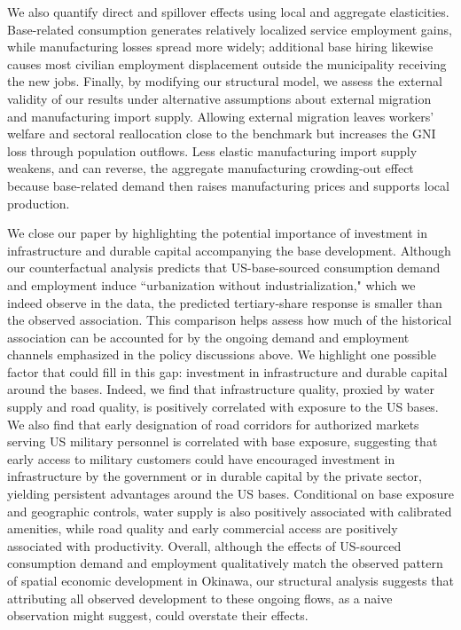 \documentclass[12pt, unicode, a4paper]{article}
\newcommand{\1}{\mbox{1}\hspace{-0.25em}\mbox{l}} %
\begin{document}
We also quantify direct and spillover effects using local and aggregate elasticities. Base-related consumption generates relatively localized service employment gains, while manufacturing losses spread more widely; additional base hiring likewise causes most civilian employment displacement outside the municipality receiving the new jobs.
Finally, by modifying our structural model, we assess the external validity of our results under alternative assumptions about external migration and manufacturing import supply. Allowing external migration leaves workers' welfare and sectoral reallocation close to the benchmark but increases the GNI loss through population outflows. Less elastic manufacturing import supply weakens, and can reverse, the aggregate manufacturing crowding-out effect because base-related demand then raises manufacturing prices and supports local production. 

We close our paper by highlighting the potential importance of investment in infrastructure and durable capital accompanying the base development. Although our counterfactual analysis predicts that US-base-sourced consumption demand and employment induce ``urbanization without industrialization," which we indeed observe in the data, the predicted tertiary-share response is smaller than the observed association. 
This comparison helps assess how much of the historical association can be accounted for by the ongoing demand and employment channels emphasized in the policy discussions above.
We highlight one possible factor that could fill in this gap: investment in infrastructure and durable capital around the bases. Indeed, we find that infrastructure quality, proxied by water supply and road quality, is positively correlated with exposure to the US bases. We also find that early designation of road corridors for authorized markets serving US military personnel is correlated with base exposure, suggesting that early access to military customers could have encouraged investment in infrastructure by the government or in durable capital by the private sector, yielding persistent advantages around the US bases. Conditional on base exposure and geographic controls, water supply is also positively associated with calibrated amenities, while road quality and early commercial access are positively associated with productivity. Overall, although the effects of US-sourced consumption demand and employment qualitatively match the observed pattern of spatial economic development in Okinawa, our structural analysis suggests that attributing all observed development to these ongoing flows, as a naive observation might suggest, could overstate their effects.
\end{document}
